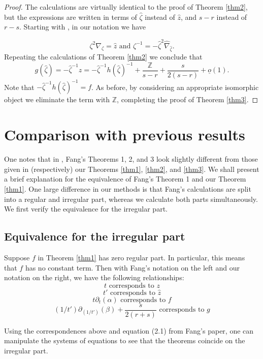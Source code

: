 \documentclass[11pt]{amsart}
\theoremstyle{plain}
\theoremstyle{definition}
\theoremstyle{remark}
\def\z{\hat{\zeta}}
\def\tz{\zeta}
\begin{document}
\begin{proof}
The calculations are virtually identical to the proof of Theorem \ref{thm2}, but the expressions are written in terms of $\z$ instead of $\hat{z}$, and $s-r$ instead of $r-s$.  Starting with \cite[Proposition 3.12]{bloch}, in our notation we have

\begin{equation*}
    \tz^2\nabla_{\tz}=\hat{z} \text{ and } \tz^{-1}=-\z^2\hat{\nabla}_{\z}.
\end{equation*}
Repeating the calculations of Theorem \ref{thm2} we conclude that
$$g(\z)=-\z^{-1}z = -\z^{-1}h(\z)^{-1}+\frac{\mathbb{Z}}{s-r} + \frac{s}{2(s-r)} + \underline{o}(1).$$
Note that $-\z^{-1}h(\z)^{-1}=f$.  As before, by considering an appropriate isomorphic object we eliminate the term with $\mathbb{Z}$, completing the proof of Theorem \ref{thm3}.
\end{proof}



\section{Comparison with previous results}\label{fang compare}

One notes that in \cite{fang}, Fang's Theorems 1, 2, and 3 look slightly different from those given in (respectively) our Theorems \ref{thm1}, \ref{thm2}, and \ref{thm3}.  We shall present a brief explanation for the equivalence of Fang's Theorem 1 and our Theorem \ref{thm1}.  One large difference in our methods is that Fang's calculations are split into a regular and irregular part, whereas we calculate both parts simultaneously.  We first verify the equivalence for the irregular part.

\subsection{Equivalence for the irregular part}\label{subsec equiv1}

Suppose $f$ in Theorem \ref{thm1} has zero regular part. In particular, this means that $f$ has no constant term.  Then with Fang's notation on the left and our notation on the right, we have the following relationships:
\[ t \text{  corresponds to  } z\]
\[ t' \text{  corresponds to  } \hat{z}\]
\[ t\partial_t(\alpha) \text{  corresponds to  } f\]
\[ (1/t')\partial_{(1/t')}(\beta)+\frac{s}{2(r+s)} \text{  corresponds to  } g\]

Using the correspondences above and equation (2.1) from Fang's paper, one can manipulate the systems of equations to see that the theorems coincide on the irregular part.
\end{document}
